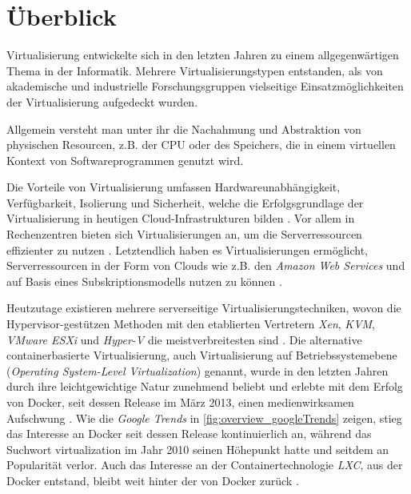 \documentclass[../main.tex]{subfiles}
\begin{document}
\chapter{Überblick}
\label{overview}
  Virtualisierung entwickelte sich in den letzten Jahren zu einem allgegenwärtigen Thema in der Informatik. Mehrere Virtualisierungstypen entstanden, als von akademische und industrielle Forschungsgruppen vielseitige Einsatzmöglichkeiten der Virtualisierung aufgedeckt wurden.

  Allgemein versteht man unter ihr die Nachahmung und Abstraktion von physischen Resourcen, z.B. der \acrshort{CPU} oder des Speichers, die in einem virtuellen Kontext von Softwareprogrammen genutzt wird.

  Die Vorteile von Virtualisierung umfassen Hardwareunabhängigkeit, Verfügbarkeit, Isolierung und Sicherheit, welche die Erfolgsgrundlage der Virtualisierung in heutigen \gls{Cloud}-Infrastrukturen bilden \cite[S.1]{containerVirtPerformance}. Vor allem in Rechenzentren bieten sich Virtualisierungen an, um die Serverressourcen effizienter zu nutzen \cite[S.1]{dockerSec1}. Letztendlich haben es Virtualisierungen ermöglicht, Serverressourcen in der Form von \glspl{Cloud} wie z.B. den \emph{Amazon Web Services}\cite{amazonWebServices} und auf Basis eines Subskriptionsmodells nutzen zu können \cite[S.1]{dockerSec1}.

  Heutzutage existieren mehrere serverseitige Virtualisierungstechniken, wovon die Hypervisor-gestützen Methoden mit den etablierten Vertretern \emph{Xen}\cite{xen}, \emph{KVM}\cite{kvm}, \emph{VMware ESXi}\cite{vmwareESXi} und \emph{Hyper-V}\cite{hyperv} die meistverbreitesten sind \cite[S.2]{containerVirtPerformance}. Die alternative containerbasierte Virtualisierung, auch Virtualisierung auf Betriebssystemebene (\emph{Operating System-Level Virtualization}) genannt, wurde in den letzten Jahren durch ihre leichtgewichtige Natur zunehmend beliebt und erlebte mit dem Erfolg von Docker, seit dessen Release im März 2013, einen medienwirksamen Aufschwung \cite{githubDockerChangelog}. Wie die \emph{Google Trends} in \fig \ref{fig:overview_googleTrends} zeigen, stieg das Interesse an Docker seit dessen Release kontinuierlich an, während das Suchwort \glqq{}virtualization\grqq{} im Jahr 2010 seinen Höhepunkt hatte und seitdem an Popularität verlor. Auch das Interesse an der Containertechnologie \emph{LXC}, aus der Docker entstand, bleibt weit hinter der von Docker zurück \cite{googleTrends}.
\end{document}
